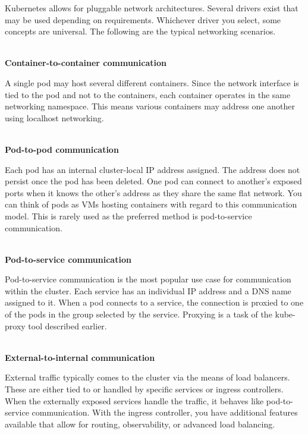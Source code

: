 
Kubernetes allows for pluggable network architectures. Several drivers exist that may be used depending on requirements. Whichever driver you select, some concepts are universal. The following are the typical networking scenarios.

\hspace*{\fill} \\ %
\noindent
\textbf{Container-to-container communication}

A single pod may host several different containers. Since the network interface is tied to the pod and not to the containers, each container operates in the same networking namespace. This means various containers may address one another using localhost networking.

\hspace*{\fill} \\ %
\noindent
\textbf{Pod-to-pod communication}

Each pod has an internal cluster-local IP address assigned. The address does not persist once the pod has been deleted. One pod can connect to another's exposed ports when it knows the other's address as they share the same flat network. You can think of pods as VMs hosting containers with regard to this communication model. This is rarely used as the preferred method is pod-to-service communication.

\hspace*{\fill} \\ %
\noindent
\textbf{Pod-to-service communication}

Pod-to-service communication is the most popular use case for communication within the cluster. Each service has an individual IP address and a DNS name assigned to it. When a pod connects to a service, the connection is proxied to one of the pods in the group selected by the service. Proxying is a task of the kube-proxy tool described earlier.

\hspace*{\fill} \\ %
\noindent
\textbf{External-to-internal communication}

External traffic typically comes to the cluster via the means of load balancers. These are either tied to or handled by specific services or ingress controllers. When the externally exposed services handle the traffic, it behaves like pod-to-service communication. With the ingress controller, you have additional features available that allow for routing, observability, or advanced load balancing.

